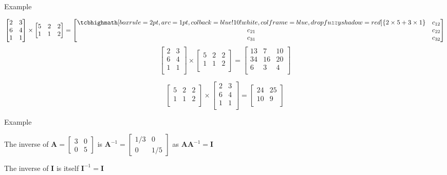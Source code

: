 \documentclass[ignorenonframetext,]{beamer}
\newcommand{\vv}[1]{\boldsymbol{#1}}
\begin{document}
\begin{frame}{Example}
\protect\hypertarget{example}{}

\[
\begin{bmatrix}2&3 \\6&4 \\1&1 \\\end{bmatrix} \times \begin{bmatrix}5&2&2 \\1&1&2 \\\end{bmatrix}  =  \begin{bmatrix} \tcbhighmath[boxrule=2pt,arc=1pt,colback=blue!10!white,colframe=blue,
  drop fuzzy shadow=red]{ 2\times 5+3\times 1 }& c_{12}\\
c_{21}& c_{22}\\
c_{31}& c_{32}
\end{bmatrix}
\] \[
\begin{bmatrix}2&3 \\6&4 \\1&1 \\\end{bmatrix} \times \begin{bmatrix}5&2&2 \\1&1&2 \\\end{bmatrix}  =  \begin{bmatrix}13&7&10 \\34&16&20 \\6&3&4 \\\end{bmatrix}
\]

\[
\begin{bmatrix}5&2&2 \\1&1&2 \\\end{bmatrix} \times \begin{bmatrix}2&3 \\6&4 \\1&1 \\\end{bmatrix}  =  \begin{bmatrix}24&25 \\10&9 \\\end{bmatrix}
\]

\end{frame}

\begin{frame}{Example}
\protect\hypertarget{example-1}{}

The inverse of \(\vv{A} = \begin{bmatrix} 3& 0 \\ 0 & 5\end{bmatrix}\)
is \(\vv{A}^{-1} = \begin{bmatrix} 1/3& 0 \\ 0 & 1/5\end{bmatrix}\) as
\(\vv{AA}^{-1} = \vv{I}\)

\bigskip

The inverse of \(\vv{I}\) is itself \(\vv{I}^{-1} =\vv{I}\) \bigskip

\end{frame}
\end{document}
